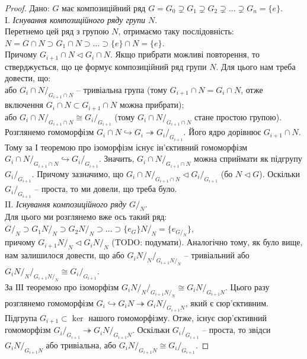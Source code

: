 \documentclass{math_library}
\begin{document}
\begin{proof}
\rightproof Дано: $G$ має композиційний ряд $G = G_0 \supsetneq G_1 \supsetneq G_2 \supsetneq \dots \supsetneq G_n = \{e\}$. \\
I. \textit{Існування композиційного ряду групи $N$}.\\
Перетнемо цей ряд з групою $N$, отримаємо таку послідовність:\\
$N = G \cap N \supset G_1 \cap N \supset \dots \supset \{e\} \cap N = \{e\}$.\\
Причому $G_{i+1} \cap N \triangleleft G_i \cap N$. Якщо прибрати можливі повторення, то стверджується, що це формує композиційний ряд групи $N$. Для цього нам треба довести, що:\\
або ${G_i \cap N}/_{G_{i+1} \cap N}$ -- тривіальна група (тому $G_{i+1} \cap N = G_i \cap N$, отже включення $G_{i} \cap N \subset G_{i+1} \cap N$ можна прибрати);\\
або ${G_i \cap N}/_{G_{i+1} \cap N} \cong {G_i}/_{G_{i+1}}$ (тому ${G_i \cap N}/_{G_{i+1} \cap N}$ стане простою групою).\\
Розглянемо гомоморфізм $G_i \cap N \hookrightarrow G_i \twoheadrightarrow G_i/_{G_{i+1}}$. Його ядро дорівнює $G_{i+1} \cap N$. Тому за І теоремою про ізоморфізм існує ін'єктивний гомоморфізм ${G_i \cap N}/_{G_{i+1} \cap N} \hookrightarrow {G_i}/_{G_{i+1}}$. Значить, ${G_i \cap N}/_{G_{i+1} \cap N}$ можна сприймати як підгрупу ${G_i}/_{G_{i+1}}$. Причому зазначимо, що ${G_i \cap N}/_{G_{i+1} \cap N} \triangleleft {G_i}/_{G_{i+1}}$ (бо $N \triangleleft G$). Оскільки ${G_i}/_{G_{i+1}}$ -- проста, то ми довели, що треба було.
\bigskip \\
II. \textit{Існування композиційного ряду $G/_N$}.\\
Для цього ми розглянемо вже ось такий ряд:\\
$G/_N \supset {G_1N}/_N \supset {G_2N}/_N \supset \dots \supset {\{e_G\} N}/_N = \{e_{G/_N}\}$,\\
причому ${G_{i+1}N}/_N \triangleleft {G_i N}/_N$ (TODO: подумати). Аналогічно тому, як було вище, нам залишилося довести, що або ${{G_i N}/_N}/_{{G_{i+1}N}/_N}$ -- тривіальний або ${{G_i N}/_N}/_{{G_{i+1}N}/_N} \cong {G_i}/_{G_{i+1}}$.\\
За ІІІ теоремою про ізоморфізм ${{G_i N}/_N}/_{{G_{i+1}N}/_N} \cong {G_i N}/_{G_{i+1} N}$. Цього разу розглянемо гомоморфізм $G_i \hookrightarrow G_i N \twoheadrightarrow {G_i N}/_{G_{i+1}N}$, який є сюр'єктивним. Підгрупа $G_{i+1} \subset \ker$ нашого гомоморфізму. Отже, існує сюр'єктивний гомоморфізм ${G_i}/_{G_{i+1}} \twoheadrightarrow {G_iN}/_{G_{i+1}N}$. Оскільки ${G_i}/_{G_{i+1}}$ -- проста, то звідси ${G_iN}/_{G_{i+1}N}$ або тривіальна, або ${G_iN}/_{G_{i+1}N} \cong {G_i}/_{G_{i+1}}$.

\end{proof}
\end{document}
